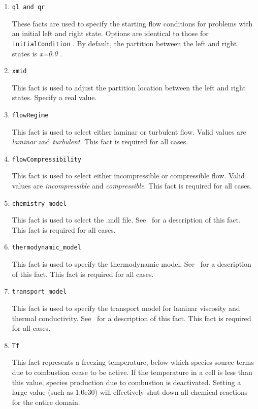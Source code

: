 \documentclass{article}
\begin{document}
\begin{enumerate}
\item{\tt ql and \tt qr}

These facts are used to specify the starting flow conditions for problems
with an initial left and right state. Options are identical to those for
{\tt initialCondition} . By default, the partition between the left and
right states is \emph{x=0.0} .

\item{\tt xmid}

This fact is used to adjust the partition location between the left and right
states. Specify a real value.

\item{\tt flowRegime}

This fact is used to select either laminar or turbulent flow. Valid values are
\emph{laminar} and \emph{turbulent}. This fact is required for all cases.

\item{\tt flowCompressibility}

This fact is used to select either incompressible or compressible flow. Valid
values are \emph{incompressible} and \emph{compressible}. This fact is required
for all cases.

\item{\tt chemistry\_model}

This fact is used to select the .mdl file. See \ChemUsersGuide\ for a
description of this fact. This fact is required for all cases.

\item{\tt thermodynamic\_model}

This fact is used to specify the thermodynamic model. See \ChemUsersGuide\ for
a description of this fact. This fact is required for all cases.

\item{\tt transport\_model}

This fact is used to specify the transport model for laminar viscosity and
thermal conductivity. See \ChemUsersGuide\ for a description of this fact.
This fact is required for all cases.

\item{\tt Tf}

This fact represents a freezing temperature, below which species source terms
due to combustion cease to be active. If the temperature in a cell is less
than this value, species production due to combustion is deactivated. Setting
a large value (such as 1.0e30) will effectively shut down all chemical
reactions for the entire domain.


\end{enumerate}
\end{document}
